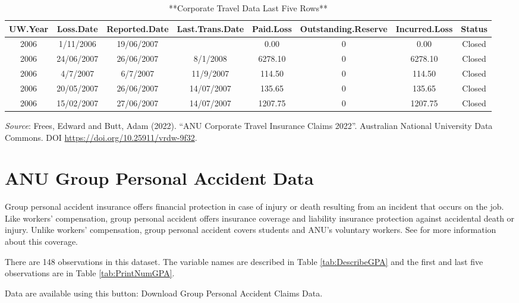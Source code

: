 \documentclass[
]{book}
\begin{document}
\begin{table}

\caption{\label{tab:PrintNumTravel}**Corporate Travel Data Last Five Rows**}
\centering
\begin{tabular}[t]{c|c|c|c|c|c|c|c}
\hline
UW.Year & Loss.Date & Reported.Date & Last.Trans.Date & Paid.Loss & Outstanding.Reserve & Incurred.Loss & Status\\
\hline
2006 & 1/11/2006 & 19/06/2007 &  & 0.00 & 0 & 0.00 & Closed\\
\hline
2006 & 24/06/2007 & 26/06/2007 & 8/1/2008 & 6278.10 & 0 & 6278.10 & Closed\\
\hline
2006 & 4/7/2007 & 6/7/2007 & 11/9/2007 & 114.50 & 0 & 114.50 & Closed\\
\hline
2006 & 20/05/2007 & 26/06/2007 & 14/07/2007 & 135.65 & 0 & 135.65 & Closed\\
\hline
2006 & 15/02/2007 & 27/06/2007 & 14/07/2007 & 1207.75 & 0 & 1207.75 & Closed\\
\hline
\end{tabular}
\end{table}

\emph{Source}: Frees, Edward and Butt, Adam (2022). ``ANU Corporate Travel Insurance Claims 2022''. Australian National University Data Commons. DOI \url{https://doi.org/10.25911/vrdw-9f32}.

\hypertarget{Sec:DataGPA}{%
\section{ANU Group Personal Accident Data}\label{Sec:DataGPA}}

Group personal accident insurance offers financial protection in case of injury or death resulting from an incident that occurs on the job. Like workers' compensation, group personal accident offers insurance coverage and liability insurance protection against accidental death or injury. Unlike workers' compensation, group personal accident covers students and ANU's voluntary workers. See \citet{frees2022ANURisks} for more information about this coverage.

There are 148 observations in this dataset. The variable names are described in Table \ref{tab:DescribeGPA} and the first and last five observations are in Table \ref{tab:PrintNumGPA}.

Data are available using this button: Download Group Personal Accident Claims Data.
\end{document}
